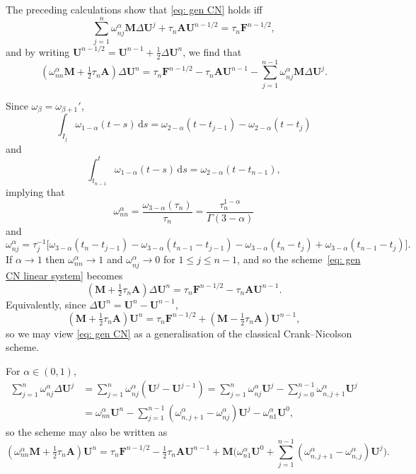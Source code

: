 \documentclass[a4paper,12pt]{article}
\newcommand{\bs}[1]{\boldsymbol{#1}}
\newcommand{\ud}{\mathrm{d}}
\begin{document}
The preceding calculations show that \eqref{eq: gen CN} holds iff
\[
\sum_{j=1}^n\omega_{nj}^\alpha\bs{M}\Delta\bs{U}^j
    +\tau_n\bs{A}\bs{U}^{n-1/2}=\tau_n\bs{F}^{n-1/2},
\]
and by writing $\bs{U}^{n-1/2}=\bs{U}^{n-1}+\tfrac12\Delta\bs{U}^n$, we find
that
\begin{equation}\label{eq: gen CN linear system}
(\omega_{nn}^\alpha\bs{M}+\tfrac12\tau_n\bs{A})\Delta\bs{U}^n
    =\tau_n\bs{F}^{n-1/2}-\tau_n\bs{A}\bs{U}^{n-1}
    -\sum_{j=1}^{n-1}\omega_{nj}^\alpha\bs{M}\Delta\bs{U}^j.
\end{equation}

Since $\omega_\beta=\omega_{\beta+1}'$,
\[
\int_{I_j}\omega_{1-\alpha}(t-s)\,\ud s
    =\omega_{2-\alpha}(t-t_{j-1})-\omega_{2-\alpha}(t-t_j)
\]
and
\[
\int_{t_{n-1}}^t\omega_{1-\alpha}(t-s)\,\ud s=\omega_{2-\alpha}(t-t_{n-1}),
\]
implying that
\[
\omega^\alpha_{nn}=\frac{\omega_{3-\alpha}(\tau_n)}{\tau_n}
    =\frac{\tau_n^{1-\alpha}}{\Gamma(3-\alpha)}
\]
and
\[
\omega^\alpha_{nj}=\tau_j^{-1}\bigl[
\omega_{3-\alpha}(t_n-t_{j-1})-\omega_{3-\alpha}(t_{n-1}-t_{j-1})
-\omega_{3-\alpha}(t_n-t_j)+\omega_{3-\alpha}(t_{n-1}-t_j)\bigr].
\]
If $\alpha\to1$ then $\omega^\alpha_{nn}\to1$ and
$\omega^\alpha_{nj}\to0$ for $1\le j\le n-1$, and so the
scheme~\eqref{eq: gen CN linear system} becomes
\[
(\bs{M}+\tfrac12\tau_n\bs{A})\Delta\bs{U}^n=\tau_n\bs{F}^{n-1/2}
    -\tau_n\bs{A}\bs{U}^{n-1}.
\]
Equivalently, since $\Delta\bs{U}^n=\bs{U}^n-\bs{U}^{n-1}$,
\[
(\bs{M}+\tfrac12\tau_n\bs{A})\bs{U}^n=\tau_n\bs{F}^{n-1/2}
    +(\bs{M}-\tfrac12\tau_n\bs{A})\bs{U}^{n-1},
\]
so we may view \eqref{eq: gen CN} as a generalisation of the
classical Crank--Nicolson scheme.

For $\alpha\in(0,1)$,
\begin{align*}
\sum_{j=1}^n\omega^\alpha_{nj}\Delta\bs{U}^j
    &=\sum_{j=1}^n\omega^\alpha_{nj}(\bs{U}^j-\bs{U}^{j-1})
    =\sum_{j=1}^n\omega^\alpha_{nj}\bs{U}^j
    -\sum_{j=0}^{n-1}\omega^\alpha_{n,j+1}\bs{U}^j\\
    &=\omega^\alpha_{nn}\bs{U}^n
    -\sum_{j=1}^{n-1}(\omega^\alpha_{n,j+1}-\omega^\alpha_{nj})\bs{U}^j
    -\omega^\alpha_{n1}\bs{U}^0,
\end{align*}
so the scheme may also be written as
\begin{equation}\label{eq: full scheme}
(\omega^\alpha_{nn}\bs{M}+\tfrac12\tau_n\bs{A})\bs{U}^n
=\tau_n\bs{F}^{n-1/2}-\tfrac12\tau_n\bs{A}\bs{U}^{n-1}
    +\bs{M}\biggl(\omega_{n1}^\alpha\bs{U}^0
    +\sum_{j=1}^{n-1}(\omega^\alpha_{n,j+1}-\omega^\alpha_{n,j})\bs{U}^j\biggr).
\end{equation}
\end{document}
